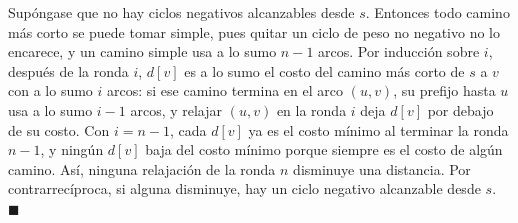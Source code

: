\ejercicio{}

Supóngase que no hay ciclos negativos alcanzables desde $s$. Entonces todo camino más corto se puede tomar simple, pues quitar un ciclo de peso no negativo no lo encarece, y un camino simple usa a lo sumo $n - 1$ arcos. Por inducción sobre $i$, después de la ronda $i$, $d[v]$ es a lo sumo el costo del camino más corto de $s$ a $v$ con a lo sumo $i$ arcos: si ese camino termina en el arco $(u, v)$, su prefijo hasta $u$ usa a lo sumo $i - 1$ arcos, y relajar $(u, v)$ en la ronda $i$ deja $d[v]$ por debajo de su costo. Con $i = n - 1$, cada $d[v]$ ya es el costo mínimo al terminar la ronda $n - 1$, y ningún $d[v]$ baja del costo mínimo porque siempre es el costo de algún camino. Así, ninguna relajación de la ronda $n$ disminuye una distancia. Por contrarrecíproca, si alguna disminuye, hay un ciclo negativo alcanzable desde $s$. \hfill$\blacksquare$
